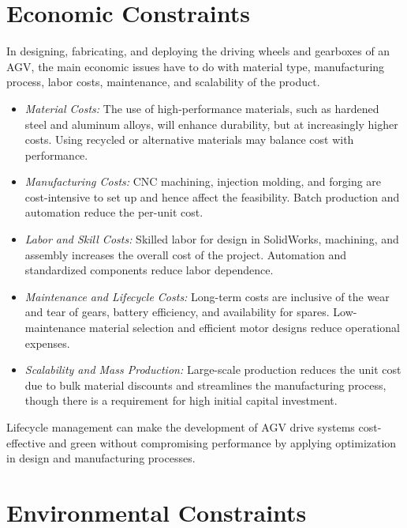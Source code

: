 \documentclass[../../main]{subfiles}
\begin{document}
\section{Economic Constraints}

In designing, fabricating, and deploying the driving wheels and gearboxes of an AGV, the main economic issues have to do with material type, manufacturing process, labor costs, maintenance, and scalability of the product.

\begin{itemize}
    \item \textit{Material Costs:} The use of high-performance materials, such as hardened steel and aluminum alloys, will enhance durability, but at increasingly higher costs. Using recycled or alternative materials may balance cost with performance.
    
    \item \textit{Manufacturing Costs:} CNC machining, injection molding, and forging are cost-intensive to set up and hence affect the feasibility. Batch production and automation reduce the per-unit cost.
    
    \item \textit{Labor and Skill Costs:} Skilled labor for design in SolidWorks, machining, and assembly increases the overall cost of the project. Automation and standardized components reduce labor dependence.
    
    \item \textit{Maintenance and Lifecycle Costs:} Long-term costs are inclusive of the wear and tear of gears, battery efficiency, and availability for spares. Low-maintenance material selection and efficient motor designs reduce operational expenses.
    
    \item \textit{Scalability and Mass Production:} Large-scale production reduces the unit cost due to bulk material discounts and streamlines the manufacturing process, though there is a requirement for high initial capital investment.
\end{itemize}

Lifecycle management can make the development of AGV drive systems cost-effective and green without compromising performance by applying optimization in design and manufacturing processes.

\section{Environmental Constraints}
\end{document}
